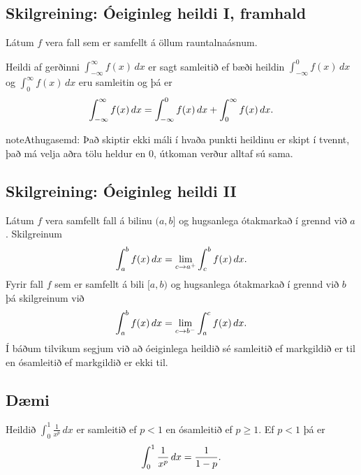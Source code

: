 \documentclass[b5paper,10pt,icelandic]{sphinxmanual}
\begin{document}
\subsection{Skilgreining: Óeiginleg heildi I, framhald}
\label{kafli06:skilgreining-oeiginleg-heildi-i-framhald}
Látum \(f\) vera fall sem er samfellt á öllum rauntalnaásnum.

Heildi af gerðinni \(\int_{-\infty}^\infty f(x)\,dx\) er sagt
samleitið ef bæði heildin \(\int_{-\infty}^0 f(x)\,dx\) og
\(\int_0^\infty f(x)\,dx\) eru samleitin og þá er
\begin{gather}
\begin{split}\int_{-\infty}^\infty f(x)\,dx=\int_{-\infty}^0 f(x)\,dx +
  \int_0^\infty f(x)\,dx.\end{split}\notag
\end{gather}
\begin{notice}{note}{Athugasemd:}
Það skiptir ekki máli í hvaða punkti heildinu er skipt í tvennt, það má
velja aðra tölu heldur en 0, útkoman verður alltaf sú sama.
\end{notice}


\subsection{Skilgreining: Óeiginleg heildi II}
\label{kafli06:skilgreining-oeiginleg-heildi-ii}
Látum \(f\) vera samfellt fall á bilinu \((a, b]\) og hugsanlega
ótakmarkað í grennd við \(a\). Skilgreinum
\begin{gather}
\begin{split}\int_a^b f(x)\,dx=\lim_{c\rightarrow a^+} \int_c^b f(x)\,dx.\end{split}\notag
\end{gather}
Fyrir fall \(f\) sem er samfellt á bili \([a, b)\) og hugsanlega
ótakmarkað í grennd við \(b\) þá skilgreinum við
\begin{gather}
\begin{split}\int_a^b f(x)\,dx=\lim_{c\rightarrow b^-} \int_a^c f(x)\,dx.\end{split}\notag
\end{gather}
Í báðum tilvikum segjum við að óeiginlega heildið sé samleitið ef
markgildið er til en ósamleitið ef markgildið er ekki til.


\subsection{Dæmi}
\label{kafli06:id9}
Heildið \(\int_0^1 \frac{1}{x^p}\,dx\) er samleitið ef \(p<1\)
en ósamleitið ef \(p\geq 1\). Ef \(p<1\) þá er
\begin{gather}
\begin{split}\int_0^1
\frac{1}{x^p}\,dx=\frac{1}{1-p}.\end{split}\notag
\end{gather}
\end{document}
